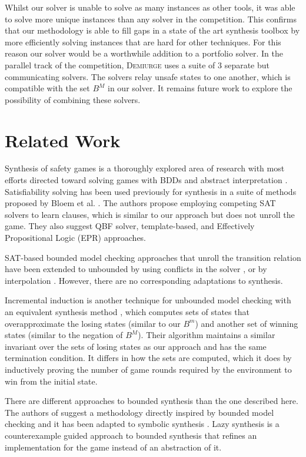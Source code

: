\documentclass{llncs}
\begin{document}
Whilst our solver is unable to solve as many instances as other tools, it was
able to solve more unique instances than any solver in the competition. This
confirms that our methodology is able to fill gaps in a state of the art
synthesis toolbox by more efficiently solving instances that are hard for other
techniques. For this reason our solver would be a worthwhile addition to a
portfolio solver. In the parallel track of the competition, \textsc{Demiurge}
uses a suite of 3 separate but communicating solvers. The solvers
relay unsafe states to one another, which is compatible with the set $B^M$ in
our solver. It remains future work to explore the possibility of combining
these solvers.

\section{Related Work}

Synthesis of safety games is a thoroughly explored area of research with most
efforts directed toward solving games with BDDs \cite{burch1990} and abstract
interpretation \cite{walker2014,brenguier2014}. Satisfiability solving has been used
previously for synthesis in a suite of methods proposed by Bloem et al.
\cite{bloem2014}. The authors propose employing competing SAT solvers
to learn clauses, which is similar to our approach but does not unroll the
game. They also suggest QBF solver, template-based, and Effectively
Propositional Logic (EPR) approaches.

SAT-based bounded model checking approaches that unroll the transition relation
have been extended to unbounded by using conflicts in the solver
\cite{mcmillan2002}, or by interpolation \cite{mcmillan2003}. However, there
are no corresponding adaptations to synthesis.

Incremental induction \cite{bradley2011} is another technique for unbounded
model checking with an equivalent synthesis method \cite{morgenstern2013},
which computes sets of states that overapproximate the losing states (similar
to our $B^m$) and another set of winning states (similar to the negation of
$B^M$). Their algorithm maintains a similar invariant over the sets of losing
states as our approach and has the same termination condition. It differs in
how the sets are computed, which it does by inductively proving the number of
game rounds required by the environment to win from the initial state.

There are different approaches to bounded synthesis than the one described
here. The authors of \cite{finkbeiner2013} suggest a methodology directly
inspired by bounded model checking and it has been adapted to symbolic
synthesis \cite{ehlers2010}. Lazy synthesis \cite{finkbeiner2012} is a
counterexample guided approach to bounded synthesis that refines an
implementation for the game instead of an abstraction of it.
\end{document}
